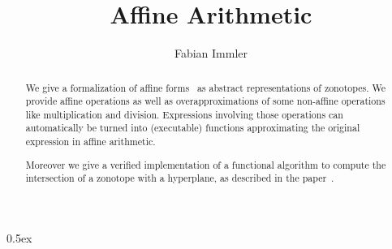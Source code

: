 \documentclass[11pt,a4paper]{article}
\title{Affine Arithmetic}
\author{Fabian Immler}
\begin{document}
\maketitle

\begin{abstract}

We give a formalization of affine forms~\cite{Stolfi2004,Girard2005} as abstract
representations of zonotopes. We provide affine operations as well as overapproximations of some
non-affine operations like multiplication and division. Expressions involving those operations can
automatically be turned into (executable) functions approximating the original expression in
affine arithmetic.

Moreover we give a verified implementation of a functional algorithm to compute the intersection of
a zonotope with a hyperplane, as described in the paper~\cite{Immler}.

\end{abstract}

\tableofcontents

\parindent 0pt\parskip 0.5ex





\end{document}
